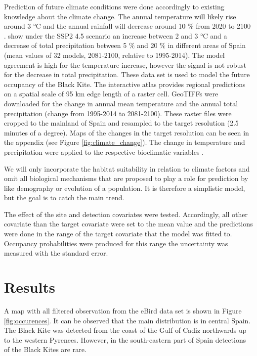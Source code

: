 \begin{multicols}{2}
Prediction of future climate conditions were done accordingly to existing knowledge about the climate change. The annual temperature will likely rise around 3 °C and the annual rainfall will decrease around 10 \% from 2020 to 2100 \parencite{aemet}. \textcite{ipcc} show under the SSP2 4.5 scenario \parencite{Riahi2017} an increase between 2 and 3 °C and a decrease of total precipitation between 5 \% and 20 \% in different areas of Spain (mean values of 32 models, 2081-2100, relative to 1995-2014). The model agreement is high for the temperature increase, however the signal is not robust for the decrease in total precipitation. These data set is used to model the future occupancy of the Black Kite. The interactive atlas provides regional predictions on a spatial scale of 95 km edge length of a raster cell. GeoTIFFs were downloaded for the change in annual mean temperature and the annual total precipitation (change from 1995-2014 to 2081-2100). These raster files were cropped to the mainland of Spain and resampled to the target resolution (2.5 minutes of a degree). Maps of the changes in the target resolution can be seen in the appendix (see Figure \ref{fig:climate_change}). The change in temperature and precipitation were applied to the respective bioclimatic variables \parencite{Fick2017}. 

We will only incorporate the habitat suitability in relation to climate factors and omit all biological mechanisms that are proposed to play a role for prediction by \textcite{Urban2016} like demography or evolution of a population. It is therefore a simplistic model, but the goal is to catch the main trend.

The effect of the site and detection covariates were tested. Accordingly, all other covariate than the target covariate were set to the mean value and the predictions were done in the range of the target covariate that the model was fitted to. Occupancy probabilities were produced for this range the uncertainty was measured with the standard error.



\section{Results}
A map with all filtered observation from the eBird data set is shown in Figure \ref{fig:occurences}. It can be observed that the main distribution is in central Spain. The Black Kite was detected from the coast of the Gulf of Cadiz northwards up to the western Pyrenees. However, in the south-eastern part of Spain detections of the Black Kites are rare.  


\end{multicols}
